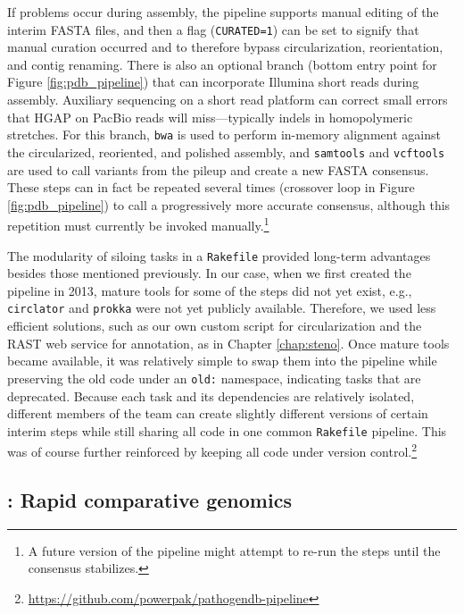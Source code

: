 If problems occur during assembly, the pipeline supports manual editing of the interim FASTA files, and then a flag (\texttt{CURATED=1}) can be set to signify that manual curation occurred and to therefore bypass circularization, reorientation, and contig renaming. There is also an optional branch (bottom entry point for Figure \ref{fig:pdb_pipeline}) that can incorporate Illumina short reads during assembly. Auxiliary sequencing on a short read platform can correct small errors that HGAP on PacBio reads will miss—typically indels in homopolymeric stretches. For this branch, \texttt{bwa}\autocite{Li2010b} is used to perform in-memory alignment against the circularized, reoriented, and polished assembly, and \texttt{samtools}\autocite{Li2009b} and \texttt{vcftools}\autocite{Danecek2011} are used to call variants from the pileup and create a new FASTA consensus. These steps can in fact be repeated several times (crossover loop in Figure \ref{fig:pdb_pipeline}) to call a progressively more accurate consensus, although this repetition must currently be invoked manually.\footnote{A future version of the pipeline might attempt to re-run the steps until the consensus stabilizes.}

The modularity of siloing tasks in a \texttt{Rakefile} provided long-term advantages besides those mentioned previously. In our case, when we first created the pipeline in 2013, mature tools for some of the steps did not yet exist, e.g., \texttt{circlator} and \texttt{prokka} were not yet publicly available. Therefore, we used less efficient solutions, such as our own custom script for circularization and the RAST web service\autocite{Aziz2008} for annotation, as in Chapter \ref{chap:steno}. Once mature tools became available, it was relatively simple to swap them into the pipeline while preserving the old code under an \texttt{old:} namespace, indicating tasks that are deprecated. Because each task and its dependencies are relatively isolated, different members of the team can create slightly different versions of certain interim steps while still sharing all code in one common \texttt{Rakefile} pipeline. This was of course further reinforced by keeping all code under version control.\footnote{\url{https://github.com/powerpak/pathogendb-pipeline}}

\subsection{\pathogendbcomparison: Rapid comparative genomics}

